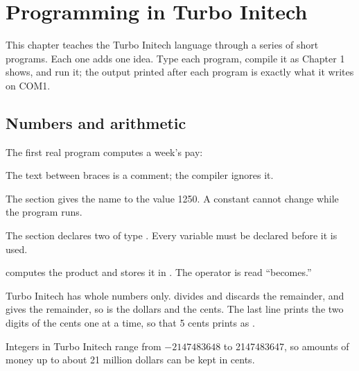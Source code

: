 \chapter{Programming in Turbo Initech}

This chapter teaches the Turbo Initech language through a series of short
programs.  Each one adds one idea.  Type each program, compile it as
Chapter 1 shows, and run it; the output printed after each program is
exactly what it writes on COM1.

\section{Numbers and arithmetic}
The first real program computes a week's pay:



The text between braces is a comment; the compiler
ignores it.

The  section gives the name  to
the value 1250.  A constant cannot change while the program runs.

The  section declares two  of
type .  Every variable must be declared before it is used.

 computes the product
and stores it in .  The operator \code{:=} is read
``becomes.''

Turbo Initech has whole numbers only.   divides
and discards the remainder, and  gives the remainder, so
 is the dollars and  the cents.
The last line prints the two digits of the cents one at a time, so that 5
cents prints as .

Integers in Turbo Initech
range from $-2147483648$ to 2147483647, so amounts of money up to about
21 million dollars can be kept in cents.

